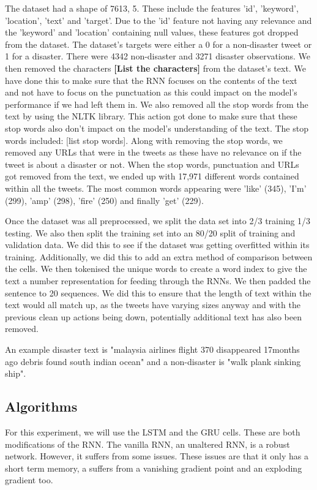 \documentclass[a4paper,10pt]{article}
\begin{document}
	The dataset had a shape of 7613, 5. These include the features 'id', 'keyword', 'location', 'text' and 'target'. Due to the 'id' feature not having any relevance and the 'keyword' and 'location' containing null values, these features got dropped from the dataset. The dataset's targets were either a 0 for a non-disaster tweet or 1 for a disaster. There were 4342 non-disaster and 3271 disaster observations.
	We then removed the characters \textbf{[List the characters]} from the dataset's text. We have done this to make sure that the RNN focuses on the contents of the text and not have to focus on the punctuation as this could impact on the model's performance if we had left them in. We also removed all the stop words from the text by using the NLTK library. This action got done to make sure that these stop words also don't impact on the model's understanding of the text. The stop words included: [list stop words]. Along with removing the stop words, we removed any URLs that were in the tweets as these have no relevance on if the tweet is about a disaster or not. When the stop words, punctuation and URLs got removed from the text, we ended up with 17,971 different words contained within all the tweets. The most common words appearing were 'like' (345), 'I'm' (299), 'amp' (298), 'fire' (250) and finally 'get' (229).
	
	Once the dataset was all preprocessed, we split the data set into 2/3 training 1/3 testing. We also then split the training set into an 80/20 split of training and validation data. We did this to see if the dataset was getting overfitted within its training. Additionally, we did this to add an extra method of comparison between the cells. We then tokenised the unique words to create a word index to give the text a number representation for feeding through the RNNs. We then padded the sentence to 20 sequences. We did this to ensure that the length of text within the text would all match up, as the tweets have varying sizes anyway and with the previous clean up actions being down, potentially additional text has also been removed.   
	
	An example disaster text is "malaysia airlines flight 370 disappeared 17months ago debris found south indian ocean" and a non-disaster is "walk plank sinking ship".

\subsection{Algorithms}
	For this experiment, we will use the LSTM and the GRU cells. These are both modifications of the RNN. The vanilla RNN, an unaltered RNN, is a robust network. However, it suffers from some issues. These issues are that it only has a short term memory, a suffers from a vanishing gradient point and an exploding gradient too.
	
\end{document}
